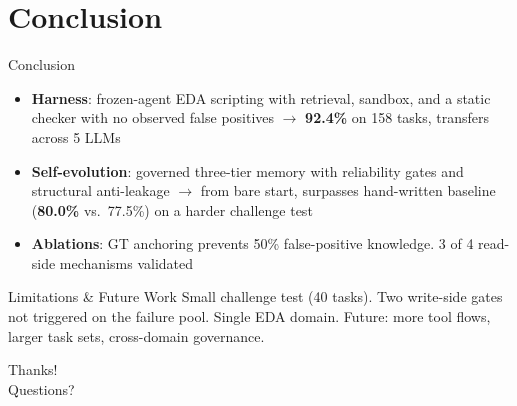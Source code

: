 \documentclass{beamer}
\begin{document}
\section{Conclusion}

\begin{frame}{Conclusion}
    \begin{itemize}
        \item \textbf{Harness}: frozen-agent EDA scripting with retrieval, sandbox, and a static checker with no observed false positives $\to$ \textbf{92.4\%} on 158 tasks, transfers across 5 LLMs
        \item \textbf{Self-evolution}: governed three-tier memory with reliability gates and structural anti-leakage $\to$ from bare start, surpasses hand-written baseline (\textbf{80.0\%} vs.\ 77.5\%) on a harder challenge test
        \item \textbf{Ablations}: GT anchoring prevents 50\% false-positive knowledge. 3 of 4 read-side mechanisms validated
    \end{itemize}
    \vfill
    \begin{block}{Limitations \& Future Work}
        \footnotesize
        Small challenge test (40 tasks). Two write-side gates not triggered on the failure pool. Single EDA domain. Future: more tool flows, larger task sets, cross-domain governance.
    \end{block}
\end{frame}

\begin{frame}[allowframebreaks]
    
    
\end{frame}

\begin{frame}
    \begin{center}
        {\Huge Thanks!}\\[12pt]
        {\large Questions?}
    \end{center}
\end{frame}
\end{document}
